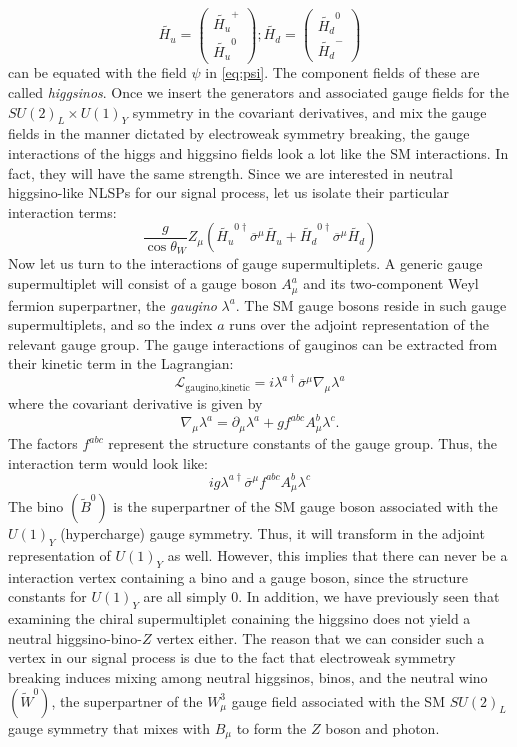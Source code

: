 \[\widetilde{H_u} = \begin{pmatrix}\widetilde{H_u}^+\\\widetilde{H_u}^0\end{pmatrix};
\widetilde{H_d} = \begin{pmatrix}\widetilde{H_d}^0\\\widetilde{H_d}^-\end{pmatrix}\]
can be equated with the field $\psi$ in \autoref{eq:psi}. The component fields of these are called \emph{higgsinos}. Once we insert the generators and associated gauge fields for the $SU(2)_L\times U(1)_Y$ symmetry in the covariant derivatives, and mix the gauge fields in the manner dictated by electroweak symmetry breaking, the gauge interactions of the higgs and higgsino fields look a lot like the SM interactions. In fact, they will have the same strength. Since we are interested in neutral higgsino-like NLSPs for our signal process, let us isolate their particular interaction terms:
\[\frac{g}{\cos\theta_W}Z_\mu\left(\widetilde{H_u}^{0\dagger}\overline{\sigma}^\mu \widetilde{H_u}+
\widetilde{H_d}^{0\dagger}\overline{\sigma}^\mu \widetilde{H_d}\right)\]
Now let us turn to the interactions of gauge supermultiplets. A generic gauge supermultiplet will consist of a gauge boson $A_\mu^a$ and its two-component Weyl fermion superpartner, the \emph{gaugino} $\lambda^a$. The SM gauge bosons reside in such gauge supermultiplets, and so the index $a$ runs over the adjoint representation of the relevant gauge group. The gauge interactions of gauginos can be extracted from their kinetic term in the Lagrangian:
\[\mathcal{L}_{\text{gaugino,kinetic}} = i\lambda^{a\dagger}\overline{\sigma}^\mu\nabla_\mu\lambda^a\]
where the covariant derivative is given by
\[\nabla_\mu\lambda^a = \partial_\mu\lambda^a + gf^{abc}A_\mu^b\lambda^c.\]
The factors $f^{abc}$ represent the structure constants of the gauge group. Thus, the interaction term would look like:
\[ig\lambda^{a\dagger}\overline{\sigma}^\mu f^{abc}A_\mu^b\lambda^c\]
The bino $(\widetilde{B}^0)$ is the superpartner of the SM gauge boson associated with the $U(1)_Y$ (hypercharge) gauge symmetry. Thus, it will transform in the adjoint representation of $U(1)_Y$ as well. However, this implies that there can never be a interaction vertex containing a bino and a gauge boson, since the structure constants for $U(1)_Y$ are all simply 0. In addition, we have previously seen that examining the chiral supermultiplet conaining the higgsino does not yield a neutral higgsino-bino-$Z$ vertex either. The reason that we can consider such a vertex in our signal process is due to the fact that electroweak symmetry breaking induces mixing among neutral higgsinos, binos, and the neutral wino $(\widetilde{W}^0)$, the superpartner of the $W_\mu^3$ gauge field associated with the SM $SU(2)_L$ gauge symmetry that mixes with $B_\mu$ to form the $Z$ boson and photon.

